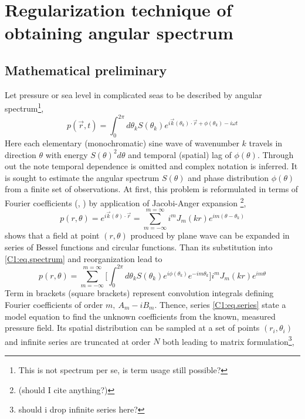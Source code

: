 \section{Regularization technique of obtaining angular spectrum}
\subsection{Mathematical preliminary}
Let pressure or sea level in complicated seas to be described by angular spectrum\footnote{This is not spectrum per se, is term usage still possible?},
\begin{equation}
\label{C1:eq.spectrum}
p(\vec{r}, t) = \int_0^{2\pi}  d\theta_k S(\theta_k) e^{i \vec{k}(\theta_k) \cdot \vec{r} + \phi(\theta_k) - i \omega t}
\end{equation}
Here each elementary (monochromatic) sine wave of wavenumber $k$ travels in direction $\theta$ with energy $S(\theta)^2 d\theta$ and temporal (spatial) lag of $\phi(\theta)$. Through out the note temporal dependence is omitted and complex notation is inferred. It is sought to estimate the angular spectrum $S(\theta)$ and phase distribution $\phi(\theta)$ from a finite set of observations. At first, this problem is reformulated in terms of Fourier coefficients (\cite{benoit1997analysing}, \cite{rafaely2004plane}) by application of Jacobi-Anger expansion \footnote{(should I cite anything?)},
\begin{equation}
p(r, \theta) = e^{i \vec{k}(\theta) \cdot \vec{r}} = \sum_{m = -\infty}^{m = \infty} i^{m} J_{m}(k r) e^{im(\theta - \theta_k)}
\end{equation}
shows that a field at point $(r, \theta)$ produced by plane wave can be expanded in series of Bessel functions and circular functions. Than its substitution into \eqref{C1:eq.spectrum} and reorganization lead to
\begin{equation}
\label{C1:eq.series}
p(r, \theta) = \sum_{m=-\infty}^{m=\infty} \big[ \int_0^{2\pi}  d\theta_k S(\theta_k) e^{i\phi(\theta_k)} e^{-im\theta_k} \big] i^m J_m(kr) e^{im\theta}
\end{equation}
Term in brackets (square brackets) represent convolution integrals defining Fourier coefficients of order $m,~A_m - i B_m$. Thence, series \eqref{C1:eq.series} state a model equation to find the unknown coefficients from the known, measured pressure field. Its spatial distribution can be sampled at a set of points $(r_i, \theta_i)$ and infinite series are truncated at order $N$ both leading to matrix formulation\footnote{should i drop infinite series here?},
